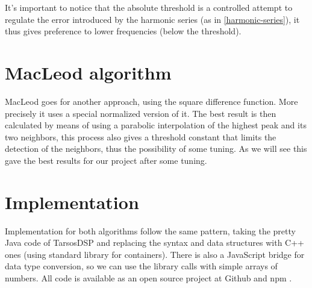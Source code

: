 It's important to notice that the absolute threshold is a controlled attempt to regulate
the error introduced by the harmonic series (as in \autoref{harmonic-series}),
it thus gives preference to lower frequencies (below the threshold).

\section{MacLeod algorithm}
MacLeod \cite{MacLeodArticle} goes for another approach, using the square difference
function. More precisely it uses a special normalized version of it. The best result
is then calculated by means of using a parabolic interpolation of the highest
peak and its two neighbors, this process also gives a threshold constant that limits
the detection of the neighbors, thus the possibility of some tuning. As we will
see this gave the best results for our project after some tuning.

\section{Implementation}
Implementation for both algorithms follow the same pattern, taking the pretty
Java code of TarsosDSP \cite{TarsosDSP} and replacing the syntax and data structures
with C++ ones (using standard library for containers). There is also a JavaScript bridge
for data type conversion, so we can use the library calls with simple arrays of numbers.
All code is available as an open source project at Github and npm \cite{node-pitchfinder}.
